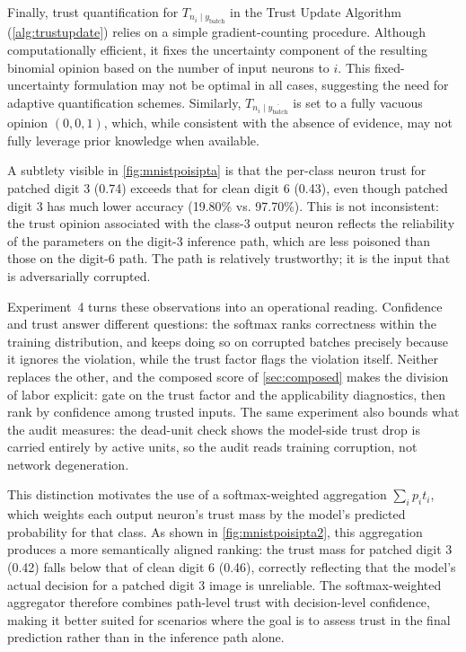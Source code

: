 Finally, trust quantification for \(T_{n_i \mid y_\text{batch}}\) in the Trust Update Algorithm (\cref{alg:trustupdate}) relies on a simple gradient-counting procedure. Although computationally efficient, it fixes the uncertainty component of the resulting binomial opinion based on the number of input neurons to \(i\). This fixed-uncertainty formulation may not be optimal in all cases, suggesting the need for adaptive quantification schemes. Similarly, \(T_{n_i \mid \overline{y_\text{batch}}}\) is set to a fully vacuous opinion \((0, 0, 1)\), which, while consistent with the absence of evidence, may not fully leverage prior knowledge when available.

A subtlety visible in \cref{fig:mnistpoisipta} is that the per-class neuron trust for patched digit 3 (0.74) exceeds that for clean digit 6 (0.43), even though patched digit 3 has much lower accuracy (19.80\% vs. 97.70\%). This is not inconsistent: the trust opinion associated with the class-3 output neuron reflects the reliability of the parameters on the digit-3 inference path, which are less poisoned than those on the digit-6 path. The path is relatively trustworthy; it is the input that is adversarially corrupted.

Experiment~4 turns these observations into an operational reading. Confidence and trust answer different questions: the softmax ranks correctness within the training distribution, and keeps doing so on corrupted batches precisely because it ignores the violation, while the trust factor flags the violation itself. Neither replaces the other, and the composed score of \cref{sec:composed} makes the division of labor explicit: gate on the trust factor and the applicability diagnostics, then rank by confidence among trusted inputs. The same experiment also bounds what the audit measures: the dead-unit check shows the model-side trust drop is carried entirely by active units, so the audit reads training corruption, not network degeneration.

This distinction motivates the use of a softmax-weighted aggregation $\sum_i p_i t_i$, which weights each output neuron's trust mass by the model's predicted probability for that class. As shown in \cref{fig:mnistpoisipta2}, this aggregation produces a more semantically aligned ranking: the trust mass for patched digit 3 (0.42) falls below that of clean digit 6 (0.46), correctly reflecting that the model's actual decision for a patched digit 3 image is unreliable. The softmax-weighted aggregator therefore combines path-level trust with decision-level confidence, making it better suited for scenarios where the goal is to assess trust in the final prediction rather than in the inference path alone.

